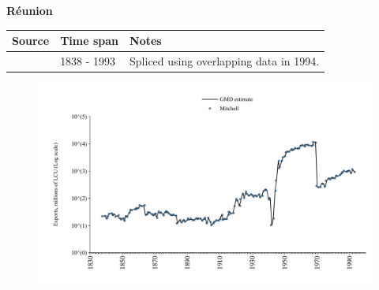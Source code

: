\documentclass[12pt,a4paper,landscape]{article}
\begin{document}
\begin{adjustbox}{max totalsize={\paperwidth}{\paperheight},center}
\begin{minipage}[t][\textheight][t]{\textwidth}
\vspace*{0.5cm}
{}
\begin{center}
{\Large\bfseries Réunion}
\end{center}
\vspace{0.5cm}
\begin{table}[H]
\centering
\small
\begin{tabular}{|l|l|l|}
\hline
\textbf{Source} & \textbf{Time span} & \textbf{Notes} \\
\hline
\rowcolor{white}\cite{Mitchell}& 1838 - 1993 &Spliced using overlapping data in 1994.\\
\hline
\end{tabular}
\end{table}
\begin{figure}[H]
\centering
\includegraphics[width=\textwidth,height=0.6\textheight,keepaspectratio]{graphs/REU_exports.pdf}
\end{figure}
\end{minipage}
\end{adjustbox}
\end{document}
